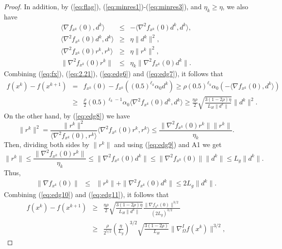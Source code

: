 \documentclass[11pt]{article}
\begin{document}
\begin{proof}
\normalsize
In addition, by (\ref{eq:flag}), (\ref{eq:minres1})-(\ref{eq:minres3}), and $\eta_{k}\geq\eta$, we also have 
\begin{eqnarray}
\langle\nabla f_{x^{k}}(0),d^{k}\rangle&\leq &-\langle\nabla^{2}f_{x^{k}}(0)d^{k},d^{k}\rangle,
\label{eq:edg6}\\
\langle\nabla^{2}f_{x^{k}}(0)d^{k},d^{k}\rangle&\geq&\eta\|d^{k}\|^{2},
\label{eq:edg7}\\
\langle\nabla^{2}f_{x^{k}}(0)r^{k},r^{k}\rangle&\geq&\eta\|r^{k}\|^{2},
\label{eq:edg8}\\
\|\nabla^{2}f_{x^{k}}(0)r^{k}\|&\leq&\eta_{k}\|\nabla^{2}f_{x^{k}}(0)d^{k}\|.
\label{eq:edg9}
\end{eqnarray}
Combining (\ref{eq:fx}), (\ref{eq:2.21}), (\ref{eq:edg6}) and (\ref{eq:edg7}), it follows that
\begin{eqnarray}
    f(x^{k})-f(x^{k+1})&=&f_{x^{k}}(0)-f_{x^{k}}((0.5)^{\ell_{k}}\alpha_{0}d^{k})\geq \rho (0.5)^{\ell_{k}}\alpha_{0}\left(-\langle\nabla f_{x^{k}}(0),d^{k}\rangle\right)\nonumber\\
    &\geq &\frac{\rho}{2}(0.5)^{\ell_{k}-1}\alpha_{0}\langle\nabla^{2}f_{x^{k}}(0)d^{k},d^{k}\rangle\geq \frac{\eta\rho}{2}\sqrt{\frac{3(1-2\rho)\eta}{L_{H}\|d^{k}\|}}\|d^{k}\|^{2}.
\label{eq:edg10}
\end{eqnarray}
On the other hand, by (\ref{eq:edg8}) we have
\[
\|r^{k}\|^{2}=\frac{\|r^{k}\|^{2}}{\langle\nabla^{2}f_{x^{k}}(0),r^{k}\rangle}\langle\nabla^{2}f_{x^{k}}(0)r^{k},r^{k}\rangle\leq\frac{\|\nabla^{2}f_{x^{k}}(0)r^{k}\|\|r^{k}\|}{\eta_{k}}.
\]
Then, dividing both sides by $\|r^{k}\|$ and using (\ref{eq:edg9}) and A1 we get
\[
\|r^{k}\|\leq\frac{\|\nabla^{2}f_{x^{k}}(0)r^{k}\|}{\eta_{k}}\leq\|\nabla^{2}f_{x^{k}}(0)d^{k}\|\leq\|\nabla^{2}f_{x^{k}}(0)\|\|d^{k}\|\leq L_{g}\|d^{k}\|.
\]
Thus,
\begin{eqnarray}
\|\nabla f_{x^{k}}(0)\|&\leq&
\|r^{k}\|+\|\nabla^{2}f_{x^{k}}(0)d^{k}\|\leq 2L_{g}\|d^{k}\|.
\label{eq:edg11}
\end{eqnarray}
Combining (\ref{eq:edg10}) and (\ref{eq:edg11}), it follows that
\small
\begin{eqnarray*}
    f(x^{k})-f(x^{k+1})&\geq &\frac{\eta\rho}{2}\sqrt{\frac{3(1-2\rho)\eta}{L_{H}\|d^{k}\|}}\frac{\|\nabla f_{x^{k}}(0)\|^{3/2}}{(2L_{g})^{3/2}}\\
    &\geq & \frac{\rho}{2^{5/2}}\left(\frac{\eta}{L_{g}}\right)^{3/2}\sqrt{\frac{3(1-2\rho)}{L_{H}}}\|\nabla_{\Omega}^{I}f(x^{k})\|^{3/2},
\end{eqnarray*}
\normalsize

\end{proof}
\end{document}
